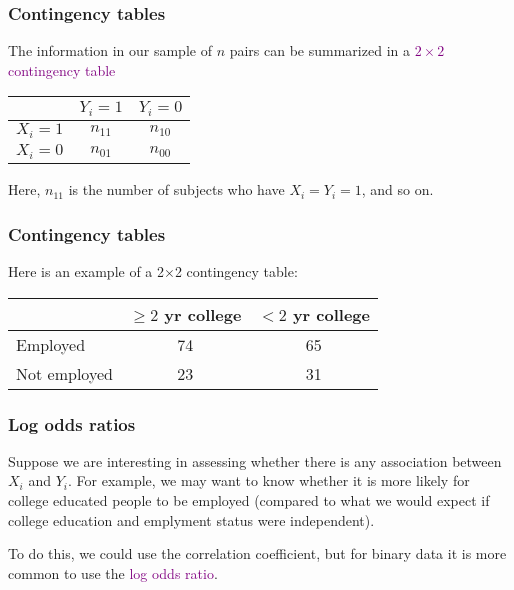 \documentclass{beamer}
\begin{document}
\begin{frame}
\frametitle{Contingency tables}

The information in our sample of $n$ pairs can be summarized in a
\textcolor{purple}{$2\times 2$ contingency table}

\bigskip

\begin{center}
\begin{tabular}{lcc}
        & $Y_i=1$ & $Y_i=0$\\\hline
$X_i=1$ & $n_{11}$ & $n_{10}$\\ 
$X_i=0$ & $n_{01}$ & $n_{00}$\\\hline
\end{tabular}
\end{center}

\bigskip

Here, $n_{11}$ is the number of subjects who have $X_i=Y_i=1$, and so on.

\end{frame}


\begin{frame}
\frametitle{Contingency tables}

Here is an example of a 2$\times$2 contingency table:

\bigskip

\begin{center}
\begin{tabular}{lcc}
             & $\ge 2$ yr college & $<2$ yr college\\\hline
Employed     & 74                 &  65\\ 
Not employed & 23 & 31\\\hline
\end{tabular}
\end{center}


\end{frame}

\begin{frame}
\frametitle{Log odds ratios}

Suppose we are interesting in assessing whether there is any
association between $X_i$ and $Y_i$.  For example, we may want to know
whether it is more likely for college educated people to be employed
(compared to what we would expect if college education and emplyment
status were independent).

To do this, we could use the correlation coefficient, but for binary
data it is more common to use the \textcolor{purple}{log odds ratio}.

\end{frame}
\end{document}
